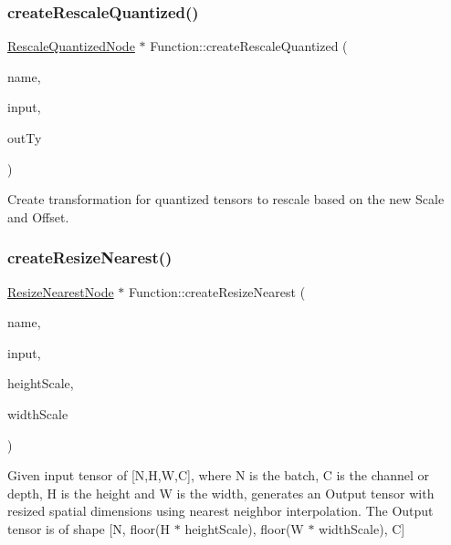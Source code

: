 \subsubsection{\texorpdfstring{create\+Rescale\+Quantized()}{createRescaleQuantized()}}
{\footnotesize\ttfamily \hyperlink{classglow_1_1_rescale_quantized_node}{Rescale\+Quantized\+Node} $\ast$ Function\+::create\+Rescale\+Quantized (\begin{DoxyParamCaption}\item[{llvm\+::\+String\+Ref}]{name,  }\item[{\hyperlink{structglow_1_1_node_value}{Node\+Value}}]{input,  }\item[{\hyperlink{structglow_1_1_type}{Type\+Ref}}]{out\+Ty }\end{DoxyParamCaption})}

Create transformation for quantized tensors to rescale based on the new Scale and Offset. \mbox{\label{classglow_1_1_function_a3e21b55f20e481869522d45d6856f8ae}} 
\subsubsection{\texorpdfstring{create\+Resize\+Nearest()}{createResizeNearest()}}
{\footnotesize\ttfamily \hyperlink{classglow_1_1_resize_nearest_node}{Resize\+Nearest\+Node} $\ast$ Function\+::create\+Resize\+Nearest (\begin{DoxyParamCaption}\item[{llvm\+::\+String\+Ref}]{name,  }\item[{\hyperlink{structglow_1_1_node_value}{Node\+Value}}]{input,  }\item[{float}]{height\+Scale,  }\item[{float}]{width\+Scale }\end{DoxyParamCaption})}

Given {\ttfamily input} tensor of \mbox{[}N,H,W,C\mbox{]}, where N is the batch, C is the channel or depth, H is the height and W is the width, generates an Output tensor with resized spatial dimensions using nearest neighbor interpolation. The Output tensor is of shape \mbox{[}N, floor(H $\ast$ {\ttfamily height\+Scale}), floor(W $\ast$ {\ttfamily width\+Scale}), C\mbox{]} \mbox{\label{classglow_1_1_function_aa4b45584a08282fd6b027ce972c5f74d}} 
